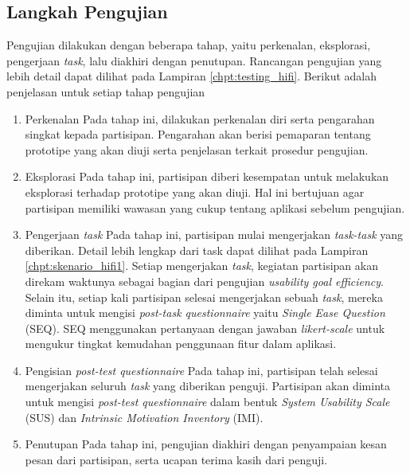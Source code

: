 \subsection{Langkah Pengujian}
\label{subsec:test_1_langkah}

Pengujian dilakukan dengan beberapa tahap, yaitu perkenalan, eksplorasi, pengerjaan \textit{task}, lalu diakhiri dengan penutupan. Rancangan pengujian yang lebih detail dapat dilihat pada Lampiran \ref{chpt:testing_hifi}. Berikut adalah penjelasan untuk setiap tahap pengujian

\begin{enumerate}
  \item Perkenalan
  \subitem Pada tahap ini, dilakukan perkenalan diri serta pengarahan singkat kepada partisipan. Pengarahan akan berisi pemaparan tentang prototipe yang akan diuji serta penjelasan terkait prosedur pengujian. 

  \item Eksplorasi
  \subitem Pada tahap ini, partisipan diberi kesempatan untuk melakukan eksplorasi terhadap prototipe yang akan diuji. Hal ini bertujuan agar partisipan memiliki wawasan yang cukup tentang aplikasi sebelum pengujian.

  \item Pengerjaan \textit{task}
  \subitem Pada tahap ini, partisipan mulai mengerjakan \textit{task-task} yang diberikan. Detail lebih lengkap dari task dapat dilihat pada Lampiran \ref{chpt:skenario_hifi1}. Setiap mengerjakan \textit{task}, kegiatan partisipan akan direkam waktunya sebagai bagian dari pengujian \textit{usability goal efficiency}. Selain itu, setiap kali partisipan selesai mengerjakan sebuah \textit{task}, mereka diminta untuk mengisi \textit{post-task questionnaire} yaitu \textit{Single Ease Question} (SEQ). SEQ menggunakan pertanyaan dengan jawaban \textit{likert-scale} untuk mengukur tingkat kemudahan penggunaan fitur dalam aplikasi.

  \item Pengisian \textit{post-test questionnaire}
  \subitem Pada tahap ini, partisipan telah selesai mengerjakan seluruh \textit{task} yang diberikan penguji. Partisipan akan diminta untuk mengisi \textit{post-test questionnaire} dalam bentuk \textit{System Usability Scale} (SUS) dan \textit{Intrinsic Motivation Inventory} (IMI). 

  \item Penutupan
  \subitem Pada tahap ini, pengujian diakhiri dengan penyampaian kesan pesan dari partisipan, serta ucapan terima kasih dari penguji. 

\end{enumerate}


